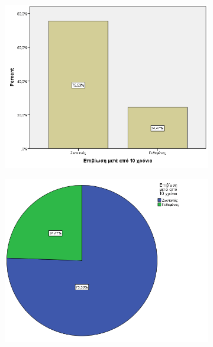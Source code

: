 \clearpage
\begin{figure}
 \centering
            \begin{subfigure}{0.7\textwidth}
     \centering
         \includegraphics[width=\textwidth]{images/7.png}
                      \end{subfigure}
                      
     \begin{subfigure}{0.6\textwidth}
     \centering
     \vspace{2cm}
         \includegraphics[width=\textwidth]{images/8.png}
                      \end{subfigure}
    \end{figure}
    
